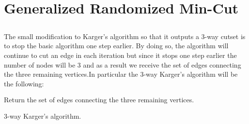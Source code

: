 \documentclass[11pt]{537homework}
\begin{document}
\section{Generalized Randomized Min-Cut}


\subsection{}
The small modification to Karger's algorithm so that it outputs a 3-way cutset is to stop the basic algorithm one step earlier. By doing so, the algorithm will continue to cut an edge in each iteration but since it stops one step earlier the number of nodes will be 3 and as a result we receive the set of edges connecting the three remaining vertices.In particular the 3-way Karger's algorithm will be the following:
\begin{algorithm}[H]
\DontPrintSemicolon
{}
\BlankLine
\nl    {}
\nl    Return the set of edges connecting the three remaining vertices.
\caption{3-way Karger's algorithm.\label{alg:3-way Karger's algorithm.}}
\end{algorithm}
\end{document}
